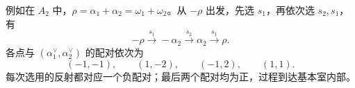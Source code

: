 \ProseParagraphBreak

例如在 \(A_2\) 中，\(\rho=\alpha_1+\alpha_2=\omega_1+\omega_2\)。从 \(-\rho\) 出发，先选 \(s_1\)，再依次选 \(s_2,s_1\)，有
\[
	-\rho\xrightarrow{s_1}-\alpha_2 \xrightarrow{s_2}\alpha_2\xrightarrow{s_1}\rho.
\]
各点与 \((\alpha_1^\vee,\alpha_2^\vee)\) 的配对依次为
\[
	(-1,-1),\qquad(1,-2),\qquad(-1,2),\qquad(1,1).
\]
每次选用的反射都对应一个负配对；最后两个配对均为正，过程到达基本室内部。
